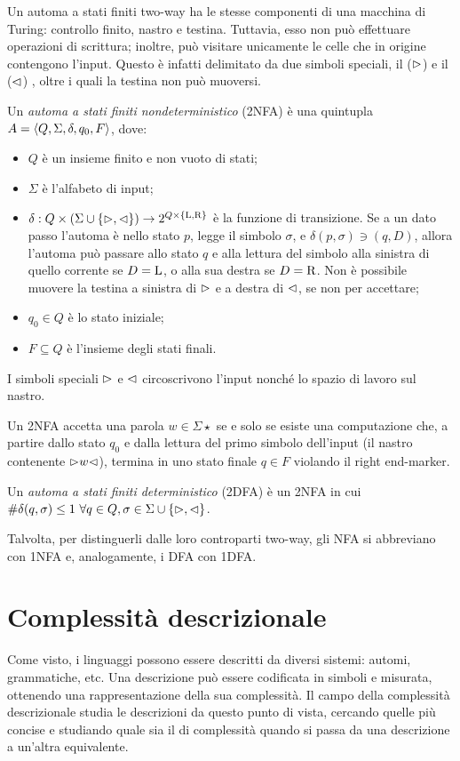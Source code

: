 Un automa a stati finiti two-way ha le stesse componenti di una macchina di Turing: controllo finito, nastro e testina. Tuttavia, esso non può effettuare operazioni di scrittura; inoltre, può visitare unicamente le celle che in origine contengono l'input. Questo è infatti delimitato da due simboli speciali, il  ($\rhd$) e il  ($\lhd$) , oltre i quali la testina non può muoversi.
\begin{defin}
	Un \emph{automa a stati finiti  nondeterministico} (2NFA) è una quintupla $A=\langle Q,\Sigma,\delta,q_0,F \rangle$, dove:
	\begin{itemize}
		\item $Q$ è un insieme finito e non vuoto di stati;
		\item $\Sigma$ è l'alfabeto di input;
		\item $\delta:Q\times(\Sigma\cup\left\{ \rhd,\lhd \right\})\to2^{Q\times\left\{ \mathrm L,\mathrm R \right\}}$ è la funzione di transizione. Se a un dato passo l'automa è nello stato $p$, legge il simbolo $\sigma$, e $\delta(p,\sigma)\ni (q,D)$, allora l'automa può passare allo stato $q$ e alla lettura del simbolo alla sinistra di quello corrente se $D=\mathrm L$, o alla sua destra se $D=\mathrm R$. Non è possibile muovere la testina a sinistra di $\rhd$ e a destra di $\lhd$, se non per accettare;
		\item $q_0\in Q$ è lo stato iniziale;
		\item $F\subseteq Q$ è l'insieme degli stati finali.
	\end{itemize}
	I simboli speciali $\rhd$ e $\lhd$ circoscrivono l'input nonché lo spazio di lavoro sul nastro.

	Un 2NFA accetta una parola $w\in\Sigma\star$ se e solo se esiste una computazione che, a partire dallo stato $q_0$ e dalla lettura del primo simbolo dell'input (il nastro contenente $\rhd w\lhd$), termina in uno stato finale $q\in F$ violando il right end-marker.
\end{defin}

\begin{defin}
	Un \emph{automa a stati finiti  deterministico} (2DFA) è un 2NFA in cui $\# \delta(q,\sigma)\leq 1 ~ \forall q\in Q,\sigma\in\Sigma\cup\left\{ \rhd,\lhd \right\}$.
\end{defin}

Talvolta, per distinguerli dalle loro controparti two-way, gli NFA  si abbreviano con 1NFA e, analogamente, i DFA con 1DFA.


\section{Complessità descrizionale}
Come visto, i linguaggi possono essere descritti da diversi sistemi: automi, grammatiche, etc. Una descrizione può essere codificata in simboli e misurata, ottenendo una rappresentazione della sua complessità. Il campo della complessità descrizionale studia le descrizioni da questo punto di vista, cercando quelle più concise e studiando quale sia il  di complessità quando si passa da una descrizione a un'altra equivalente.

